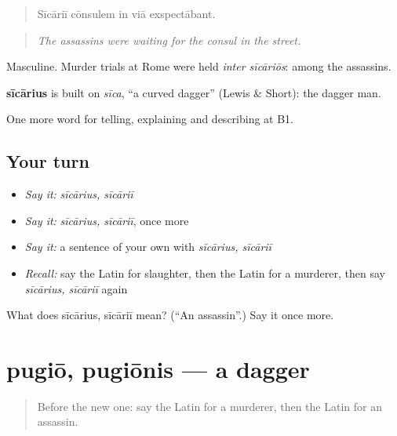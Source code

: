 \begin{quote}
Sīcāriī cōnsulem in viā exspectābant.
\end{quote}

\begin{quote}
\emph{The assassins were waiting for the consul in the street.}
\end{quote}

Masculine. Murder trials at Rome were held \emph{inter sīcāriōs}: among the assassins.

\begin{cousinweb}
\textbf{sīcārius} is built on \emph{sīca}, \textquotedblleft{}a curved dagger\textquotedblright{} (Lewis \& Short): the dagger man.
\end{cousinweb}

\begin{grammarlens}[title={What you've built}]
One more word for telling, explaining and describing at B1.
\end{grammarlens}

\subsection*{Your turn}
\begin{itemize}
\raggedright
  \item \emph{Say it:} \emph{sīcārius, sīcāriī}
  \item \emph{Say it:} \emph{sīcārius, sīcāriī}, once more
  \item \emph{Say it:} a sentence of your own with \emph{sīcārius, sīcāriī}
  \item \emph{Recall:} say the Latin for slaughter, then the Latin for a murderer, then say \emph{sīcārius, sīcāriī} again
\end{itemize}

\begin{tcolorbox}[breakable,colback=teal!4,colframe=teal!35!black,title={Before you move on}]
What does sīcārius, sīcāriī mean? (\textquotedblleft{}An assassin\textquotedblright{}.) Say it once more.
\end{tcolorbox}
\section[pugiō, pugiōnis]{pugiō, pugiōnis — a dagger}

\label{lesson:LA-C306-pugio}



\begin{quote}
Before the new one: say the Latin for a murderer, then the Latin for an assassin.
\end{quote}

